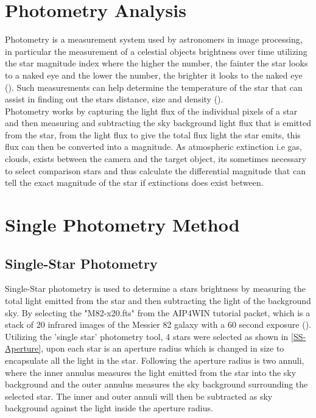 \documentclass[12pt]{article}
\begin{document}
\section{Photometry Analysis}
\label{Section 1}

Photometry is a measurement system used by astronomers in image processing, in particular the measurement of a celestial objects brightness over time utilizing the star magnitude index where the higher the number, the fainter the star looks to a naked eye and the lower the number, the brighter it looks to the naked eye (\cite{ImageProcessing}). Such measurements can help determine the temperature of the star that can assist in finding out the stars distance, size and density (\cite{Photometry}).  \\

Photometry works by capturing the light flux of the individual pixels of a star and then measuring and subtracting the sky background light flux that is emitted from the star, from the light flux to give the total flux light the star emits, this flux can then be converted into a magnitude. As atmospheric extinction i.e gas, clouds, exists between the camera and the target object, its sometimes necessary to select comparison stars and thus calculate the differential magnitude that can tell the exact magnitude of the star if extinctions does exist between. 


\section{Single Photometry Method}
\label{Section 2}
\subsection{Single-Star Photometry}
\label{SubSection 2a}


Single-Star photometry is used to determine a stars brightness by measuring the total light emitted from the star and then subtracting the light of the background sky. By selecting the "M82-x20.fts" from the AIP4WIN tutorial packet, which is a stack of 20 infrared images of the Messier 82 galaxy with a 60 second exposure (\cite{ImageProcessingTutorial}). Utilizing the 'single star' photometry tool, 4 stars were selected as shown in \cref{SS-Aperture}, upon each star is an aperture radius which is changed in size to encapsulate all the light in the star. Following the aperture radius is two annuli, where the inner annulus measures the light emitted from the star into the sky background and the outer annulus measures the sky background surrounding the selected star. The inner and outer annuli will then be subtracted as sky background against the light inside the aperture radius. \\
\end{document}
